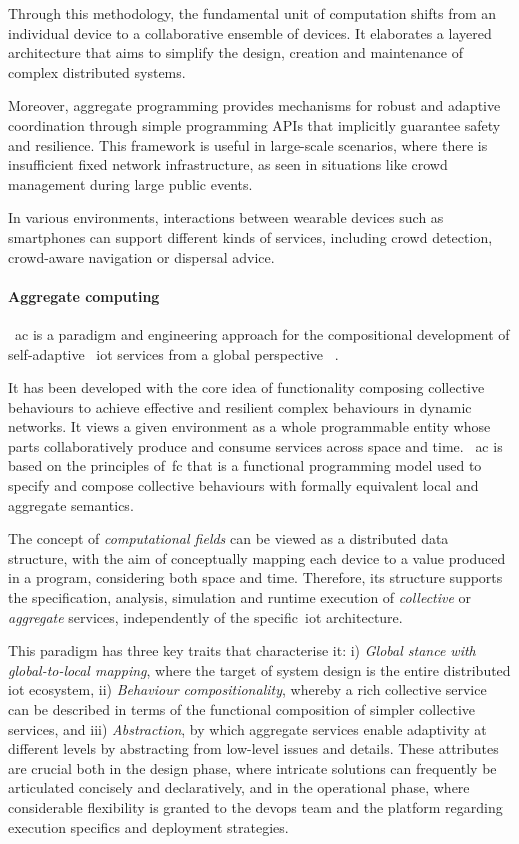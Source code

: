 Through this methodology, the fundamental unit of computation shifts from an individual device to a collaborative
ensemble of devices.
It elaborates a layered architecture that aims to simplify the design, creation and maintenance of complex distributed
systems.

Moreover, aggregate programming provides mechanisms for robust and adaptive coordination through simple programming APIs
that implicitly guarantee safety and resilience.
This framework is useful in large-scale scenarios, where there is insufficient fixed network infrastructure, as seen in
situations like crowd management during large public events.

In various environments, interactions between wearable devices such as smartphones can support different kinds of services,
including crowd detection, crowd-aware navigation or dispersal advice.

\paragraph{Aggregate computing}
~\ac{ac} is a paradigm and engineering approach for the compositional development of self-adaptive ~\ac{iot} services
from a global perspective ~\cite{10.1145/3579353}.

It has been developed with the core idea of functionality composing collective behaviours to achieve effective and resilient
complex behaviours in dynamic networks.
It views a given environment as a whole programmable entity whose parts collaboratively produce and consume services
across space and time.
~\ac{ac} is based on the principles of~\ac{fc} that is a functional programming model used to specify
and compose collective behaviours with formally equivalent local and aggregate semantics.

The concept of \emph{computational fields} can be viewed as a distributed data structure,
with the aim of conceptually mapping each device to a value produced in a program, considering both
space and time.
Therefore, its structure supports the specification, analysis, simulation and runtime execution of \emph{collective}
or \emph{aggregate} services, independently of the specific~\ac{iot} architecture.

This paradigm has three key traits that characterise it:
    i) \emph{Global stance with global-to-local mapping}, where the target of system design is the entire distributed
        \ac{iot} ecosystem,
    ii) \emph{Behaviour compositionality}, whereby a rich collective service can be described in terms of the functional
        composition of simpler collective services, and
    iii) \emph{Abstraction}, by which aggregate services enable adaptivity at different levels by abstracting from low-level
        issues and details.
These attributes are crucial both in the design phase, where intricate solutions can frequently be articulated concisely
and declaratively, and in the operational phase, where considerable flexibility is granted to the devops team and the
platform regarding execution specifics and deployment strategies.


